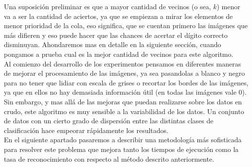 Una suposición preliminar es que a mayor cantidad de vecinos (o sea, $k$) menor va a ser la cantidad de aciertos, ya que se empiezan a mirar los elementos de menor prioridad de la cola, eso significa, que se cuentan primero las imágenes que más difieren y eso puede hacer que las chances de acertar el dígito correcto disminuyan. Ahondaremos mas en detalle en la siguiente sección, cuando pongamos a prueba cual es la mejor cantidad de vecinos para este algoritmo.
\\
Al comienzo del desarrollo de los experimentos pensamos en diferentes maneras de mejorar el procesamiento de las imágenes, ya sea pasandolas a blanco y negro para no tener que lidiar con escala de grises o recortar los bordes de las imágenes, ya que en ellos no hay demasiada información útil (en todas las imágenes vale 0).
\\
Sin embargo, y mas allá de las mejoras que puedan realizarse sobre los datos en crudo, este algoritmo es muy sensible a la variabilidad de los datos. Un conjunto de datos con un cierto grado de dispersión entre las distintas clases de clasificación hace empeorar rápidamente los resultados.
\\
En el siguiente apartado pasaremos a describir una metodología más sofisticada para resolver este problema que mejora tanto los tiempos de ejecución como la tasa de reconocimiento con respecto al método descrito anteriormente.

